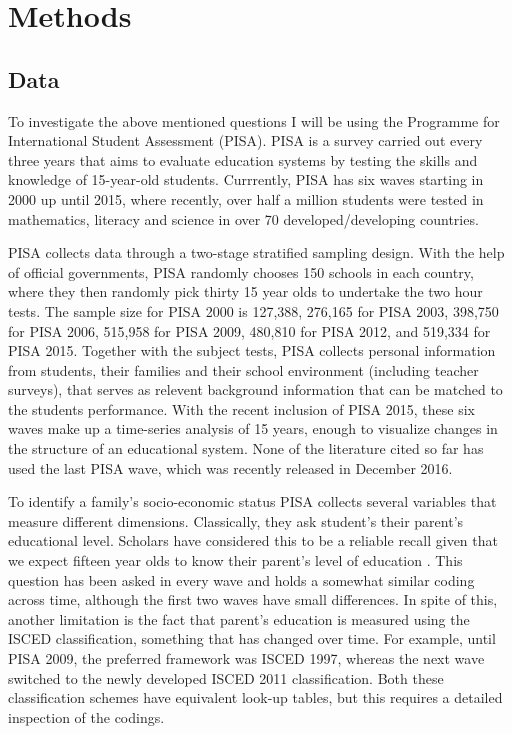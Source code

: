 \documentclass[11pt, a4paper]{article}\usepackage[]{graphicx}\usepackage[]{color}
\begin{document}
\section{Methods}

\subsection{Data}



To investigate the above mentioned questions I will be using the Programme for International Student Assessment (PISA). PISA is a survey carried out every three years that aims to evaluate education systems by testing the skills and knowledge of 15-year-old students. Currrently, PISA has six waves starting in 2000 up until 2015, where recently, over half a million students were tested in mathematics, literacy and science in over 70 developed/developing countries.

PISA collects data through a two-stage stratified sampling design. With the help of official governments, PISA randomly chooses 150 schools in each country, where they then randomly pick thirty 15 year olds to undertake the two hour tests. The sample size for PISA 2000 is 127,388, 276,165 for PISA 2003, 398,750 for PISA 2006, 515,958 for PISA 2009, 480,810 for PISA 2012, and 519,334 for PISA 2015. Together with the subject tests, PISA collects personal information from students, their families and their school environment (including teacher surveys), that serves as relevent background information that can be matched to the students performance. With the recent inclusion of PISA 2015, these six waves make up a time-series analysis of 15 years, enough to visualize changes in the structure of an educational system. None of the literature cited so far has used the last PISA wave, which was recently released in December 2016.

To identify a family's socio-economic status PISA collects several variables that measure different dimensions. Classically, they ask student's their parent's educational level. Scholars have considered this to be a reliable recall given that we expect fifteen year olds to know their parent's level of education \citep{reardon2011}. This question has been asked in every wave and holds a somewhat similar coding across time, although the first two waves have small differences. In spite of this, another limitation is the fact that parent's education is measured using the ISCED classification, something that has changed over time. For example, until PISA 2009, the preferred framework was ISCED 1997, whereas the next wave switched to the newly developed ISCED 2011 classification. Both these classification schemes have equivalent look-up tables, but this requires a detailed inspection of the codings.
\end{document}
